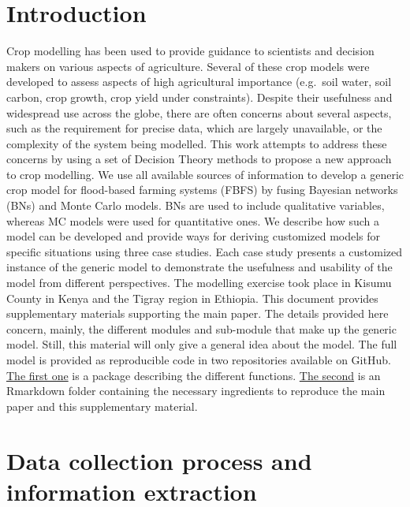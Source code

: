 \documentclass[]{elsarticle} %
\newcommand{\beginsupplement}{\setcounter{table}{0}
\renewcommand{\thetable}{S\arabic{table}} \setcounter{figure}{0}
\renewcommand{\thefigure}{S\arabic{figure}}}
\begin{document}
\beginsupplement

\hypertarget{introduction}{%
\section*{Introduction}\label{introduction}}

Crop modelling has been used to provide guidance to scientists and decision makers on various aspects of agriculture. Several of these crop models were developed to assess aspects of high agricultural importance (e.g.~soil water, soil carbon, crop growth, crop yield under constraints). Despite their usefulness and widespread use across the globe, there are often concerns about several aspects, such as the requirement for precise data, which are largely unavailable, or the complexity of the system being modelled.
This work attempts to address these concerns by using a set of Decision Theory methods to propose a new approach to crop modelling. We use all available sources of information to develop a generic crop model for flood-based farming systems (FBFS) by fusing Bayesian networks (BNs) and Monte Carlo models. BNs are used to include qualitative variables, whereas MC models were used for quantitative ones. We describe how such a model can be developed and provide ways for deriving customized models for specific situations using three case studies. Each case study presents a customized instance of the generic model to demonstrate the usefulness and usability of the model from different perspectives. The modelling exercise took place in Kisumu County in Kenya and the Tigray region in Ethiopia. This document provides supplementary materials supporting the main paper. The details provided here concern, mainly, the different modules and sub-module that make up the generic model. Still, this material will only give a general idea about the model. The full model is provided as reproducible code in two repositories available on GitHub. \href{https://github.com/Issoufou-Liman/decisionSupportExtra}{The first one} is a package describing the different functions. \href{https://github.com/Issoufou-Liman/Modelling_FBFS}{The second} is an Rmarkdown folder containing the necessary ingredients to reproduce the main paper and this supplementary material.

\hypertarget{data-collection-process-and-information-extraction}{%
\section{Data collection process and information extraction}\label{data-collection-process-and-information-extraction}}
\end{document}
